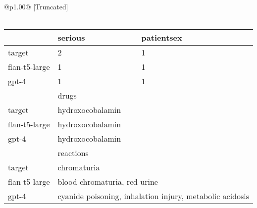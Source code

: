 \begin{longtable}{@{}p{}@{}}
[Truncated] \\ \\ \begin{tabular}{lll} \hline & serious & patientsex \\ \hline target & 2 & 1 \\ flan-t5-large & 1 & 1 \\ gpt-4 & 1 & 1 \\ \hline & \multicolumn{2}{l}{drugs} \\ \hline target & \multicolumn{2}{p{13.2cm}}{hydroxocobalamin} \\ flan-t5-large & \multicolumn{2}{p{13.2cm}}{hydroxocobalamin} \\ gpt-4 & \multicolumn{2}{p{13.2cm}}{hydroxocobalamin} \\ \hline & \multicolumn{2}{l}{reactions} \\ \hline target & \multicolumn{2}{p{13.2cm}}{chromaturia} \\ flan-t5-large & \multicolumn{2}{p{13.2cm}}{blood chromaturia, red urine} \\ gpt-4 & \multicolumn{2}{p{13.2cm}}{cyanide poisoning, inhalation injury, metabolic acidosis} \\ \hline \end{tabular} \\ \\

\end{longtable}
